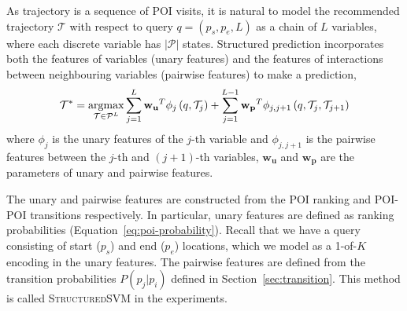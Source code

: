 As trajectory is a sequence of POI visits,
it is natural to model the recommended trajectory $\mathcal{T}$ with respect to query $q = (p_s, p_e, L)$
as a chain of $L$ variables, where each discrete variable has $|\mathcal{P}|$ states.
Structured prediction incorporates both the features of variables (unary features) and
the features of interactions between neighbouring variables (pairwise features) to make a
prediction,
\begin{displaymath}
    \mathcal{T}^* = \operatorname*{argmax}_{\mathcal{T} \in \mathcal{P}^L} 
                    \sum_{j=1}^L \mathbf{w_u}^T \phi_j \left( q, \mathcal{T}_j \right) +
                    \sum_{j=1}^{L-1} \mathbf{w_p}^T \phi_{j, j+1} \left( q, \mathcal{T}_j, \mathcal{T}_{j+1} \right)
\end{displaymath}
where $\phi_j$ is the unary features of the $j$-th variable and $\phi_{j, j+1}$ is the pairwise features between
the $j$-th and $(j+1)$-th variables, $\mathbf{w_u}$ and $\mathbf{w_p}$ are the
parameters of unary and pairwise features.

The unary and pairwise features are constructed from the POI ranking and POI-POI transitions respectively.
In particular, unary features are defined as ranking probabilities (Equation~\ref{eq:poi-probability}).
Recall that we have a query consisting of start ($p_s$) and end ($p_e$) locations, which
we model as a 1-of-$K$ encoding in the unary features.
The pairwise features are defined from the transition probabilities $P(p_j | p_i)$ defined in
Section~\ref{sec:transition}.
This method is called \textsc{StructuredSVM} in the experiments.

